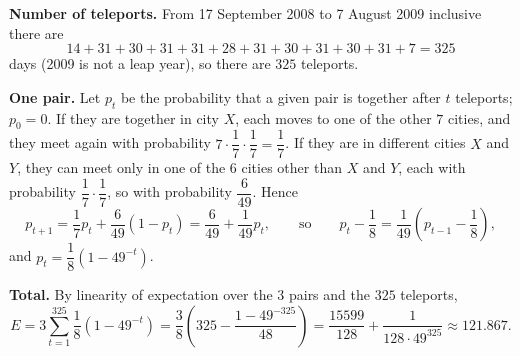 \textbf{Number of teleports.} From 17 September 2008 to 7 August 2009 inclusive there are
\[14+31+30+31+31+28+31+30+31+30+31+7=325\]
days (2009 is not a leap year), so there are $325$ teleports.

\textbf{One pair.} Let $p_t$ be the probability that a given pair is together after $t$ teleports; $p_0=0$. If they are together in city $X$, each moves to one of the other $7$ cities, and they meet again with probability $7\cdot\dfrac17\cdot\dfrac17=\dfrac17$. If they are in different cities $X$ and $Y$, they can meet only in one of the $6$ cities other than $X$ and $Y$, each with probability $\dfrac17\cdot\dfrac17$, so with probability $\dfrac{6}{49}$. Hence
\[p_{t+1}=\dfrac17p_t+\dfrac{6}{49}(1-p_t)=\dfrac{6}{49}+\dfrac{1}{49}p_t,\qquad\text{so}\qquad p_t-\dfrac18=\dfrac1{49}\left(p_{t-1}-\dfrac18\right),\]
and $p_t=\dfrac18\left(1-49^{-t}\right)$.

\textbf{Total.} By linearity of expectation over the $3$ pairs and the $325$ teleports,
\[E=3\sum_{t=1}^{325}\dfrac18\left(1-49^{-t}\right)=\dfrac38\left(325-\dfrac{1-49^{-325}}{48}\right)=\boxed{\dfrac{15599}{128}+\dfrac{1}{128\cdot49^{325}}}\approx121.867.\]
